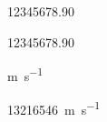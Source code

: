 \documentclass{scrartcl}
\begin{document}
12345678.90

\num{12345678.90}

\si{\meter\per\second}

\SI{13216546}{\meter\per\second}
\end{document}

